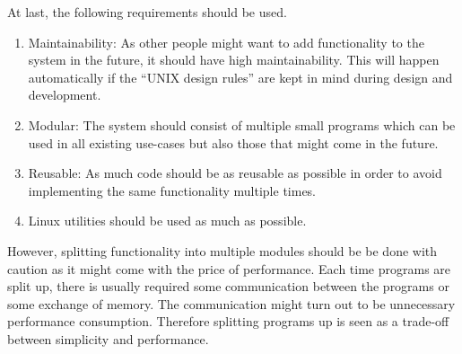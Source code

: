 At last, the following requirements should be used.


\begin{enumerate}
	\item Maintainability:
As other people might want to add functionality to the system in the future, it should have high maintainability. This will happen automatically if the ``UNIX design rules'' are kept in mind during design and development.
\item Modular:
The system should consist of multiple small programs which can be used in all existing use-cases but also those that might come in the future.
\item Reusable:
As much code should be as reusable as possible in order to avoid implementing the same functionality multiple times.

    \item Linux utilities should be used as much as possible.
\end{enumerate}

However, splitting functionality into multiple modules should be be done with caution as it might come with the price of performance. Each time programs are split up, there is usually required some communication between the programs or some exchange of memory. The communication might turn out to be unnecessary performance consumption. Therefore splitting programs up is seen as a trade-off between simplicity and performance.











